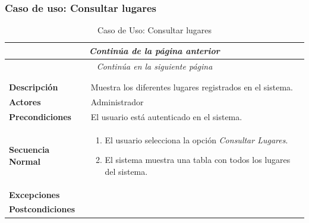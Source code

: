 \newpage
\subsubsection*{Caso de uso: Consultar lugares }
\begin{longtable}{| p{4cm} | p{10cm} |}
\endfirsthead
\multicolumn{2}{c}{\textit{Continúa de la página anterior}}\\[12pt]
\hline
\endhead
\hline
\multicolumn{2}{c}{\textit{Continúa en la siguiente página}} \\
\endfoot
\hline
\caption{Caso de Uso: Consultar lugares}\label{fig:1}\\
\endlastfoot


\hline
\multicolumn{2}{|c|}{\textbf{CU$<$34$>$ - Consultar Lugares}} \\

\hline
\textbf{Descripción} &
Muestra los diferentes lugares registrados en el sistema.\\

\hline
\textbf{Actores} &
Administrador\\

\hline
\textbf{Precondiciones} &
El usuario está autenticado en el sistema.\\

\hline
\textbf{Secuencia Normal} &\mbox{}\par\vspace{-\baselineskip}
\begin{enumerate}[leftmargin=0.7cm, topsep=0.1cm]
\item El usuario selecciona la opción \textit{Consultar Lugares}.
\item El sistema muestra una tabla con todos los lugares del sistema.
\end{enumerate}


\\
\hline
\textbf{Excepciones} &\mbox{}\par\vspace{-\baselineskip}
\\

\hline
\textbf{Postcondiciones} & \\
\hline
\end{longtable}



\newpage
